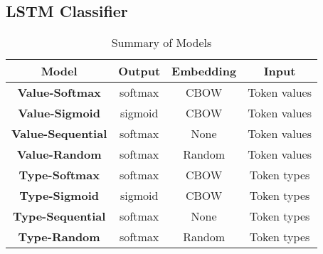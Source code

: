\subsection{LSTM Classifier}

\begin{table}
\begin{center}
\begingroup
\setlength{\tabcolsep}{6pt} %
\renewcommand{\arraystretch}{1.5} %
\begin{tabular}{|| c | c | c | c ||} 
    \hline
    Model & Output & Embedding & Input \\ 
    \hline\hline
    \textbf{Value-Softmax} & softmax & CBOW & Token values \\
    \hline
    \textbf{Value-Sigmoid} &  sigmoid & CBOW & Token values \\ 
    \hline
    \textbf{Value-Sequential} & softmax & None & Token values \\
    \hline
    \textbf{Value-Random} & softmax & Random & Token values \\
    \hline
    \textbf{Type-Softmax} & softmax & CBOW & Token types \\
    \hline
    \textbf{Type-Sigmoid} & sigmoid & CBOW & Token types \\
    \hline
    \textbf{Type-Sequential} & softmax & None & Token types \\
    \hline
    \textbf{Type-Random} & softmax & Random & Token types \\
    \hline
\end{tabular}
\endgroup
\caption{\label{model-sum}Summary of Models}
\end{center}
\end{table}
